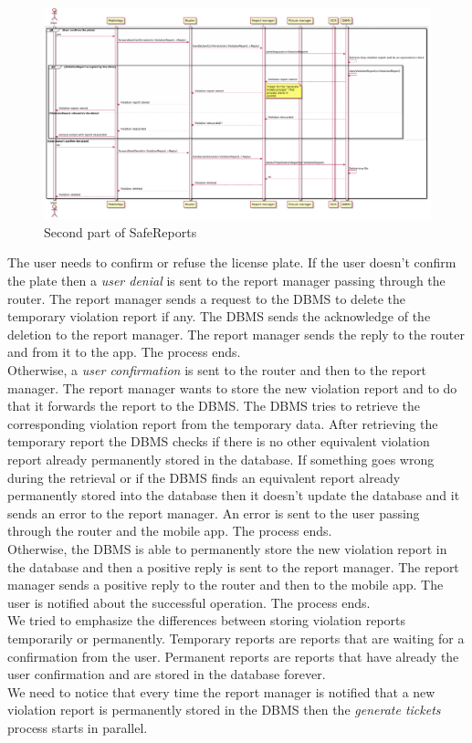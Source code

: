 \documentclass[./main.tex]{subfiles}
\begin{document}
\begin{figure}[H]
\centering
\includegraphics[width=\textwidth]{resources/sequence_diagrams/safeReports2}
\caption{Second part of SafeReports}
\end{figure}

The user needs to confirm or refuse the license plate.
If the user doesn't confirm the plate then a \textit{user denial} is sent to the report manager passing through the router. The report manager sends a request to the DBMS to delete the temporary violation report if any. The DBMS sends the acknowledge of the deletion to the report manager. The report manager sends the reply to the router and from it to the app. The process ends.\\
Otherwise, a \textit{user confirmation} is sent to the router and then to the report manager.
The report manager wants to store the new violation report and to do that it forwards the report to the DBMS. The DBMS tries to retrieve the corresponding violation report from the temporary data. After retrieving the temporary report the DBMS checks if there is no other equivalent violation report already permanently stored in the database.
If something goes wrong during the retrieval or if the DBMS finds an equivalent report already permanently stored into the database then it doesn't update the database and it sends an error to the report manager. An error is sent to the user passing through the router and the mobile app. The process ends.\\
Otherwise, the DBMS is able to permanently store the new violation report in the database and then a positive reply is sent to the report manager. The report manager sends a positive reply to the router and then to the mobile app. The user is notified about the successful operation. The process ends.\\
We tried to emphasize the differences between storing violation reports temporarily or permanently. Temporary reports are reports that are waiting for a confirmation from the user. Permanent reports are reports that have already the user confirmation and are stored in the database forever.\\
We need to notice that every time the report manager is notified that a new violation report is permanently stored in the DBMS then the \textit{generate tickets} process starts in parallel.
\end{document}
